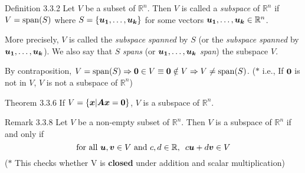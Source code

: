 \documentclass[11pt,landscape]{article}
\begin{document}
\begin{multicols}{2}
\begin{justifying}
\begin{namedthm*}{Definition 3.3.2}
     Let \(V\) be a subset of \(\mathbb{R}^n\). Then \(V\) is called a \textit{subspace} of \(\mathbb{R}^n\) if \(V = \operatorname{span}(S)\) where \(S = \{\bm{u_1}, \dots, \bm{u_k}\}\) for some vectors \(\bm{u_1}, \dots, \bm{u_k} \in \mathbb{R}^n \).
     
     \medskip
     \noindent
     More precisely, \(V\) is called the \textit{subspace spanned} by \(S\) (or the \textit{subspace spanned} by \( \bm{u_1}, \dots, \bm{u_k} \)). We also say that \(S\) \textit{spans} (or \(\bm{u_1}, \dots, \bm{u_k}\) \textit{span}) the subspace \(V\).
     
     \medskip
     \noindent
     By contraposition, \(V = \operatorname{span}(S) \Rightarrow \bm{0} \in V \equiv \bm{0} \notin V \Rightarrow V \ne \operatorname{span}(S)\). (\(\ast\) i.e., If \(\bm{0}\) is not in \(V\), \(V\) is not a subspace of \(\mathbb{R}^n\))
\end{namedthm*}

\begin{namedthm*}{Theorem 3.3.6}
	If \(V = \{\bm{x} | \bm{Ax} = \bm{0}\}\), \(V\) is a subspace of \(\mathbb{R}^n\).
\end{namedthm*}

\begin{namedthm*}{Remark 3.3.8}
    Let \(V\) be a non-empty subset of \(\mathbb{R}^n\). Then \(V\) is a subspace of \(\mathbb{R}^n\) if and only if 
    \[
        \text{for all } \bm{u}, \bm{v} \in V \text{ and } c, d\in \mathbb{R},\enspace c\bm{u} + d\bm{v} \in V
    \]
    (\(\ast\) This checks whether V is \textbf{closed} under addition and scalar multiplication)
\end{namedthm*}

\end{justifying}

\end{multicols}
\end{document}

